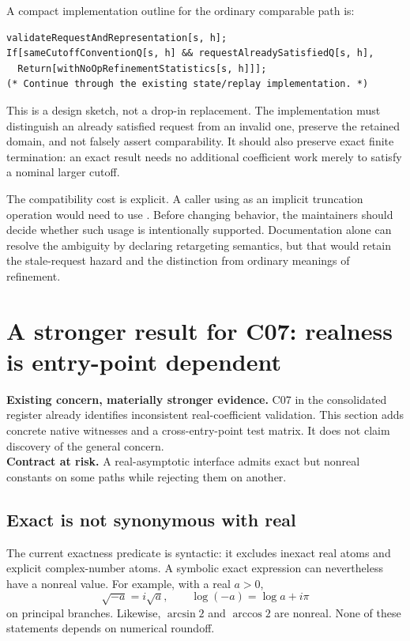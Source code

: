 \documentclass[11pt,letterpaper]{article}
\newcommand{\code}[1]{\texttt{\detokenize{#1}}}
\begin{document}
A compact implementation outline for the ordinary comparable path is:
\begin{lstlisting}
validateRequestAndRepresentation[s, h];
If[sameCutoffConventionQ[s, h] && requestAlreadySatisfiedQ[s, h],
  Return[withNoOpRefinementStatistics[s, h]]];
(* Continue through the existing state/replay implementation. *)
\end{lstlisting}
This is a design sketch, not a drop-in replacement. The implementation must distinguish an already satisfied request from an invalid one, preserve the retained domain, and not falsely assert comparability. It should also preserve exact finite termination: an exact result needs no additional coefficient work merely to satisfy a nominal larger cutoff.

The compatibility cost is explicit. A caller using \code{SeriesRefine[s, smallerH]} as an implicit truncation operation would need to use \code{SeriesTruncate}. Before changing behavior, the maintainers should decide whether such usage is intentionally supported. Documentation alone can resolve the ambiguity by declaring retargeting semantics, but that would retain the stale-request hazard and the distinction from ordinary meanings of refinement.

\section{A stronger result for C07: realness is entry-point dependent}
\label{sec:c07}
\begin{tcolorbox}
\textbf{Existing concern, materially stronger evidence.} C07 in the consolidated register already identifies inconsistent real-coefficient validation. This section adds concrete native witnesses and a cross-entry-point test matrix. It does not claim discovery of the general concern.\\
\textbf{Contract at risk.} A real-asymptotic interface admits exact but nonreal constants on some paths while rejecting them on another.
\end{tcolorbox}

\subsection{Exact is not synonymous with real}
The current exactness predicate is syntactic: it excludes inexact real atoms and explicit complex-number atoms. A symbolic exact expression can nevertheless have a nonreal value. For example, with a real $a>0$,
\begin{equation}
 \sqrt{-a}=i\sqrt a,\qquad \log(-a)=\log a+i\pi
\end{equation}
on principal branches. Likewise, $\arcsin 2$ and $\arccos 2$ are nonreal. None of these statements depends on numerical roundoff.
\end{document}
